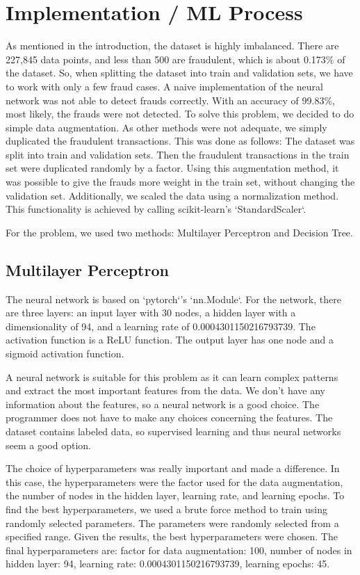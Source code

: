 \documentclass[a4paper, 10pt, conference]{ieeeconf}      %
\begin{document}
\section{Implementation / ML Process}
\label{sec:methods}
As mentioned in the introduction, the dataset is highly imbalanced. There are 227,845 data points, and less than 500 are fraudulent, which is about 0.173\% of the dataset. So, when splitting the dataset into train and validation sets, we have to work with only a few fraud cases. 
A naive implementation of the neural network was not able to detect frauds correctly. With an accuracy of 99.83\%, most likely, the frauds were not detected. 
To solve this problem, we decided to do simple data augmentation. As other methods were not adequate, we simply duplicated the fraudulent transactions. 
This was done as follows: The dataset was split into train and validation sets. Then the fraudulent transactions in the train set were duplicated randomly by a factor. 
Using this augmentation method, it was possible to give the frauds more weight in the train set, without changing the validation set. 
Additionally, we scaled the data using a normalization method. This functionality is achieved by calling scikit-learn's `StandardScaler`. 

For the problem, we used two methods: Multilayer Perceptron and Decision Tree. 

\subsection{Multilayer Perceptron}

The neural network is based on `pytorch`'s `nn.Module`. For the network, there are three layers: 
an input layer with 30 nodes, a hidden layer with a dimensionality of 94, and a learning rate of 0.0004301150216793739. 
The activation function is a ReLU function. The output layer has one node and a sigmoid activation function.

A neural network is suitable for this problem as it can learn complex patterns and extract the most important features from the data. 
We don't have any information about the features, so a neural network is a good choice. The programmer does not have to make any choices concerning the features. 
The dataset contains labeled data, so supervised learning and thus neural networks seem a good option.

The choice of hyperparameters was really important and made a difference. In this case, the hyperparameters were the factor used for the data augmentation, the number of nodes in the hidden layer, learning rate, and learning epochs. 
To find the best hyperparameters, we used a brute force method to train using randomly selected parameters. The parameters were randomly selected from a specified range. 
Given the results, the best hyperparameters were chosen. 
The final hyperparameters are: factor for data augmentation: 100, number of nodes in hidden layer: 94, learning rate: 0.0004301150216793739, learning epochs: 45.
\end{document}

